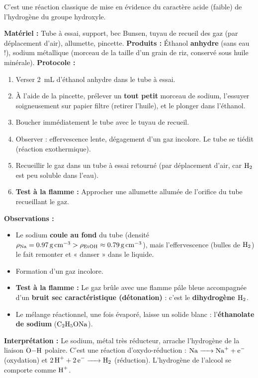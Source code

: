 \documentclass[11pt]{article}
\begin{document}
C'est une réaction classique de mise en évidence du caractère acide (faible) de l'hydrogène du groupe hydroxyle.

\begin{experience}
\textbf{Matériel :} Tube à essai, support, bec Bunsen, tuyau de recueil des gaz (par déplacement d'air), allumette, pincette.
\textbf{Produits :} Éthanol \textbf{anhydre} (sans eau !), sodium métallique (morceau de la taille d'un grain de riz, conservé sous huile minérale).
\textbf{Protocole :}
\begin{enumerate}
    \item Verser \SI{2}{mL} d'éthanol anhydre dans le tube à essai.
    \item À l'aide de la pincette, prélever un \textbf{tout petit} morceau de sodium, l'essuyer soigneusement sur papier filtre (retirer l'huile), et le plonger dans l'éthanol.
    \item Boucher immédiatement le tube avec le tuyau de recueil.
    \item Observer : effervescence lente, dégagement d'un gaz incolore. Le tube se tiédit (réaction exothermique).
    \item Recueillir le gaz dans un tube à essai retourné (par déplacement d'air, car $\ce{H2}$ est peu soluble dans l'eau).
    \item \textbf{Test à la flamme :} Approcher une allumette allumée de l'orifice du tube recueillant le gaz.
\end{enumerate}
\textbf{Observations :}
\begin{itemize}
    \item Le sodium \textbf{coule au fond} du tube (densité $\rho_{\ce{Na}} = \SI{0,97}{g.cm^{-3}} > \rho_{\ce{EtOH}} \approx \SI{0,79}{g.cm^{-3}}$), mais l'effervescence (bulles de $\ce{H2}$) le fait remonter et « danser » dans le liquide.
    \item Formation d'un gaz incolore.
    \item \textbf{Test à la flamme :} Le gaz brûle avec une flamme pâle bleue accompagnée d'un \textbf{bruit sec caractéristique (détonation)} : c'est le \textbf{dihydrogène $\ce{H2}$}.
    \item Le mélange réactionnel, une fois évaporé, laisse un solide blanc : l'\textbf{éthanolate de sodium} ($\ce{C2H5ONa}$).
\end{itemize}
\textbf{Interprétation :} Le sodium, métal très réducteur, arrache l'hydrogène de la liaison $\ce{O-H}$ polaire. C'est une réaction d'oxydo-réduction : $\ce{Na -> Na+ + e-}$ (oxydation) et $\ce{2 H+ + 2 e- -> H2}$ (réduction). L'hydrogène de l'alcool se comporte comme $\ce{H+}$.
\end{experience}
\end{document}
